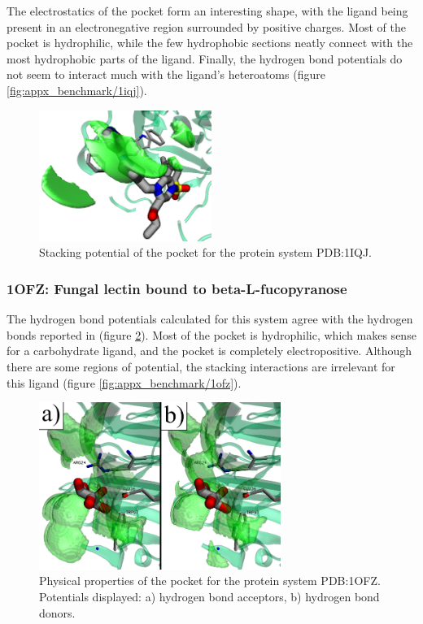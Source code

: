       The electrostatics of the pocket form an interesting shape, with the ligand being present in an electronegative region surrounded by positive charges. Most of the pocket is hydrophilic, while the few hydrophobic sections neatly connect with the most hydrophobic parts of the ligand. Finally, the hydrogen bond potentials do not seem to interact much with the ligand's heteroatoms (figure \ref{fig:appx_benchmark/1iqj}).

      \begin{figure}[H]
        \centering
        \includegraphics[width=0.5\textwidth]{figures/results/benchmark_prot/1iqj.png}
        \caption{\label{fig:benchmark/1iqj} Stacking potential of the pocket for the protein system PDB:1IQJ.}
      \end{figure}

    \subsubsection{1OFZ: Fungal lectin bound to beta-L-fucopyranose}
      The hydrogen bond potentials calculated for this system agree with the hydrogen bonds reported in \cite{hbonds_2023} (figure \ref{fig:benchmark/1ofz}). Most of the pocket is hydrophilic, which makes sense for a carbohydrate ligand, and the pocket is completely electropositive. Although there are some regions of potential, the stacking interactions are irrelevant for this ligand (figure \ref{fig:appx_benchmark/1ofz}).

      \begin{figure}[H]
        \centering
        \includegraphics[width=0.7\textwidth]{figures/results/benchmark_prot/1ofz.png}
        \caption{\label{fig:benchmark/1ofz} Physical properties of the pocket for the protein system PDB:1OFZ. Potentials displayed: a) hydrogen bond acceptors, b) hydrogen bond donors.}
      \end{figure}

